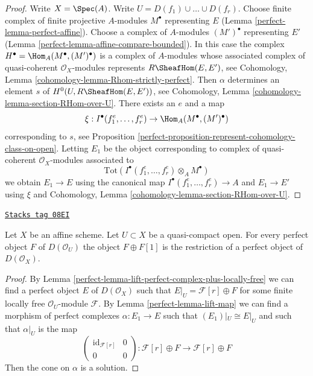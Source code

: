 \begin{proof}

Write $X = \Spec(A)$. Write $U = D(f_1) \cup \ldots \cup D(f_r)$. Choose
finite complex of finite projective $A$-modules $M^\bullet$ representing
$E$ (Lemma \ref{perfect-lemma-perfect-affine}). Choose a complex of $A$-modules
$(M')^\bullet$ representing $E'$ (Lemma \ref{perfect-lemma-affine-compare-bounded}).
In this case the complex $H^\bullet = \Hom_A(M^\bullet, (M')^\bullet)$
is a complex of $A$-modules whose associated complex of quasi-coherent
$\mathcal{O}_X$-modules represents $R\SheafHom(E, E')$, see
Cohomology, Lemma \ref{cohomology-lemma-Rhom-strictly-perfect}.
Then $\alpha$ determines an element $s$ of $H^0(U, R\SheafHom(E, E'))$, see
Cohomology, Lemma \ref{cohomology-lemma-section-RHom-over-U}.
There exists an $e$ and a map
$$
\xi : I^\bullet(f_1^e, \ldots, f_r^e) \to \Hom_A(M^\bullet, (M')^\bullet)
$$
corresponding to $s$, see
Proposition \ref{perfect-proposition-represent-cohomology-class-on-open}.
Letting $E_1$ be the object corresponding to
complex of quasi-coherent $\mathcal{O}_X$-modules
associated to
$$
\text{Tot}(I^\bullet(f_1^e, \ldots, f_r^e) \otimes_A M^\bullet)
$$
we obtain $E_1 \to E$ using the canonical map
$I^\bullet(f_1^e, \ldots, f_r^e) \to A$ and $E_1 \to E'$
using $\xi$ and
Cohomology, Lemma \ref{cohomology-lemma-section-RHom-over-U}.
\end{proof}

\begin{lemma}
\label{perfect-lemma-lift-perfect-complex-plus-shift}
\href{https://stacks.math.columbia.edu/tag/08EI}{\texttt{Stacks tag 08EI}}

Let $X$ be an affine scheme. Let $U \subset X$ be a quasi-compact open.
For every perfect object $F$ of $D(\mathcal{O}_U)$
the object $F \oplus F[1]$ is the restriction of
a perfect object of $D(\mathcal{O}_X)$.
\end{lemma}

\begin{proof}

By Lemma \ref{perfect-lemma-lift-perfect-complex-plus-locally-free}
we can find a perfect object $E$ of $D(\mathcal{O}_X)$
such that $E|_U = \mathcal{F}[r] \oplus F$ for some finite locally
free $\mathcal{O}_U$-module $\mathcal{F}$.
By Lemma \ref{perfect-lemma-lift-map} we can find a morphism of
perfect complexes $\alpha : E_1 \to E$ such that $(E_1)|_U \cong E|_U$
and such that $\alpha|_U$ is the map
$$
\left(
\begin{matrix}
\text{id}_{\mathcal{F}[r]} & 0 \\
0 & 0
\end{matrix}
\right)
:
\mathcal{F}[r] \oplus F \to \mathcal{F}[r] \oplus F
$$
Then the cone on $\alpha$ is a solution.
\end{proof}

